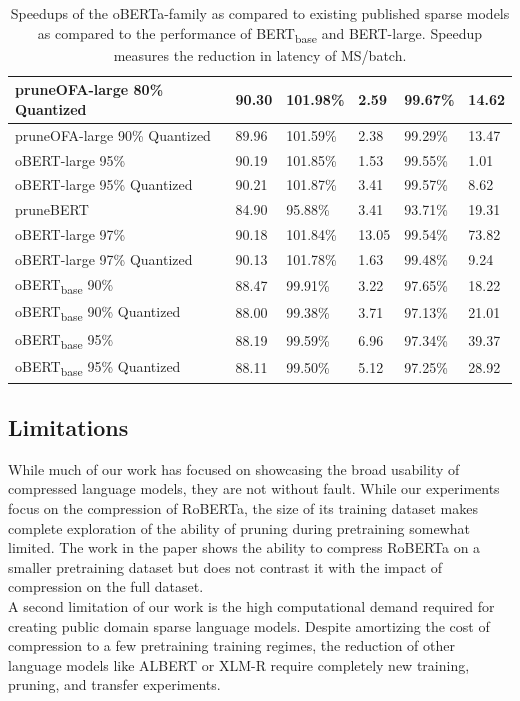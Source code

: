 \begin{table}[!ht]
{\begin{tabular}{|l|l|*2l|*2l|}
        pruneOFA-large 80\% Quantized & 90.30 & 101.98\% & 2.59 & 99.67\% & 14.62 \\ \hline
        pruneOFA-large 90\% Quantized & 89.96 & 101.59\% & 2.38 & 99.29\% & 13.47 \\ \hline
        oBERT-large 95\% & 90.19 & 101.85\% & 1.53 & 99.55\% & 1.01 \\ \hline
        oBERT-large 95\% Quantized & 90.21 & 101.87\% & 3.41 & 99.57\% & 8.62 \\ \hline
        pruneBERT & 84.90 & 95.88\% & 3.41 & 93.71\% & 19.31 \\ \hline
        oBERT-large 97\% & 90.18 & 101.84\% & 13.05 & 99.54\% & 73.82 \\ \hline
        oBERT-large 97\% Quantized & 90.13 & 101.78\% & 1.63 & 99.48\% & 9.24 \\ \hline
        oBERT\textsubscript{base} 90\% & 88.47 & 99.91\% & 3.22 & 97.65\% & 18.22 \\ \hline
        oBERT\textsubscript{base} 90\% Quantized & 88.00 & 99.38\% & 3.71 & 97.13\% & 21.01 \\ \hline
        oBERT\textsubscript{base} 95\% & 88.19 & 99.59\% & 6.96 & 97.34\% & 39.37 \\ \hline
        oBERT\textsubscript{base} 95\% Quantized & 88.11 & 99.50\% & 5.12 & 97.25\% & 28.92 \\ \hline
        \bottomrule
    \end{tabular}}
    \caption{Speedups of the oBERTa-family as compared to existing published sparse models as compared to the performance of BERT\textsubscript{base} and BERT-large. Speedup measures the reduction in latency of MS/batch.}
    \label{tab:inference-competitive-full}
\end{table}
\subsection{Limitations}
While much of our work has focused on showcasing the broad usability of compressed language models, they are not without fault. While our experiments focus on the compression of RoBERTa, the size of its training dataset makes complete exploration of the ability of pruning during pretraining somewhat limited. The work in the paper shows the ability to compress RoBERTa on a smaller pretraining dataset but does not contrast it with the impact of compression on the full dataset. \\
A second limitation of our work is the high computational demand required for creating public domain sparse language models. Despite amortizing the cost of compression to a few pretraining training regimes, the reduction of other language models like ALBERT \cite{Lan2019ALBERTAL} or XLM-R \cite{XLMR} require completely new training, pruning, and transfer experiments. 
